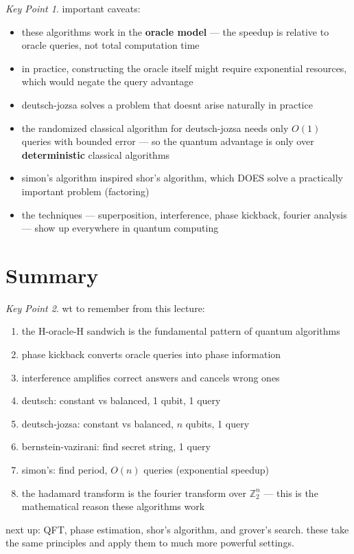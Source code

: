 \documentclass[11pt,a4paper]{article}
\theoremstyle{definition}
\theoremstyle{remark}
\newtheorem*{keypoint}{Key Point}
\begin{document}
\begin{keypoint}
important caveats:
\begin{itemize}
    \item these algorithms work in the \textbf{oracle model} --- the speedup is relative to oracle queries, not total computation time
    \item in practice, constructing the oracle itself might require exponential resources, which would negate the query advantage
    \item deutsch-jozsa solves a problem that doesnt arise naturally in practice
    \item the randomized classical algorithm for deutsch-jozsa needs only $O(1)$ queries with bounded error --- so the quantum advantage is only over \textbf{deterministic} classical algorithms
    \item simon's algorithm inspired shor's algorithm, which DOES solve a practically important problem (factoring)
    \item the techniques --- superposition, interference, phase kickback, fourier analysis --- show up everywhere in quantum computing
\end{itemize}
\end{keypoint}

\section{Summary}

\begin{keypoint}
wt to remember from this lecture:
\begin{enumerate}
    \item the H-oracle-H sandwich is the fundamental pattern of quantum algorithms
    \item phase kickback converts oracle queries into phase information
    \item interference amplifies correct answers and cancels wrong ones
    \item deutsch: constant vs balanced, 1 qubit, 1 query
    \item deutsch-jozsa: constant vs balanced, $n$ qubits, 1 query
    \item bernstein-vazirani: find secret string, 1 query
    \item simon's: find period, $O(n)$ queries (exponential speedup)
    \item the hadamard transform is the fourier transform over $\mathbb{Z}_2^n$ --- this is the mathematical reason these algorithms work
\end{enumerate}
\end{keypoint}

next up: QFT, phase estimation, shor's algorithm, and grover's search. these take the same principles and apply them to much more powerful settings.
\end{document}
